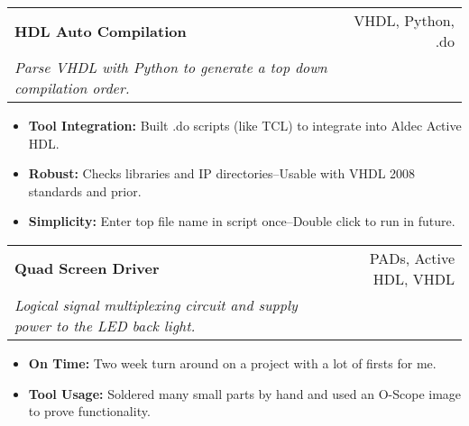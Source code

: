 \documentclass[letterpaper,10pt]{article}
\makeatletter
\newenvironment{smitemize}{
  \vspace{-3pt}
  \begin{itemize}
    \setlength{\itemsep}{0pt}
    \setlength{\parskip}{0pt}
    \setlength{\parsep}{0pt}
  }
  {\end{itemize}}
\newcommand{\ressubheading}[4]{
  \begin{tabular*}{6.5in}{l@{\cftdotfill{\cftsecdotsep}\extracolsep{\fill}}r}
    \textbf{#1} &         #2 \\
    \textit{#3} & \textit{#4} \\
  \end{tabular*}
  }
\makeatother
\begin{document}
\ressubheading{HDL Auto Compilation}
              {VHDL, Python, .do}
              {Parse VHDL with Python to generate a top down compilation order. } 
              {}
\begin{smitemize}
  \item {\bf Tool Integration:} Built .do scripts (like TCL) to integrate into Aldec Active HDL.
  \item {\bf Robust:} Checks libraries and IP directories--Usable with VHDL 2008 standards and prior.
  \item {\bf Simplicity:} Enter top file name in script once--Double click to run in future.
\end{smitemize}

\ressubheading{Quad Screen Driver}
              {PADs, Active HDL, VHDL}
              {Logical signal multiplexing circuit and supply power to the LED back light. }
              {}
\begin{smitemize}
  \item {\bf On Time:} Two week turn around on a project with a lot of firsts for me.
  \item {\bf Tool Usage:} Soldered many small parts by hand and used an O-Scope image to prove functionality.
\end{smitemize}  

\end{document}
